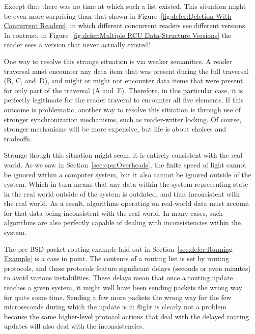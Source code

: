 Except that there was no time at which such a list existed.
This situation might be even more surprising than that shown in
Figure~\ref{fig:defer:Deletion With Concurrent Readers},
in which different concurrent readers see different versions.
In contrast, in
Figure~\ref{fig:defer:Multiple RCU Data-Structure Versions}
the reader sees a version that never actually existed!

One way to resolve this strange situation is via weaker semanitics.
A reader traversal must encounter any data item that was present
during the full traversal (B, C, and~D), and might or might not
encounter data items that were present for only part of the
traversal (A and~E).
Therefore, in this particular case, it is perfectly legitimate for
the reader traveral to encounter all five elements.
If this outcome is problematic, another way to resolve this situation is
through use of stronger synchronization mechanisms, such as reader-writer
locking.
Of course, stronger mechanisms will be more expensive, but life is
about choices and tradeoffs.

Strange though this situation might seem, it is entirely consistent with
the real world.
As we saw in
Section~\ref{sec:cpu:Overheads},
the finite speed of light cannot be ignored within a computer system,
but it also cannot be ignored outside of the system.
Which in turn means that any data within the system representing
state in the real world outside of the system is outdated, and thus
inconsistent with the real world.
As a result, algorithms operating on real-world data must account for
that data being inconsistent with the real world.
In many cases, such algorithms are also perfectly capable of dealing
with inconsistencies within the system.

The pre-BSD packet routing example laid out in
Section~\ref{sec:defer:Running Example}
is a case in point.
The contents of a routing list is set by routing protocols, and these
protocols feature significant delays (seconds or even minutes) to avoid
various instabilities.
These delays mean that once a routing update reaches a given system,
it might well have been sending packets the wrong way for quite some time.
Sending a few more packets the wrong way for the few microseconds during
which the update is in flight is clearly not a problem because the same
higher-level protocol actions that deal with the delayed routing updates
will also deal with the inconsistencies.

